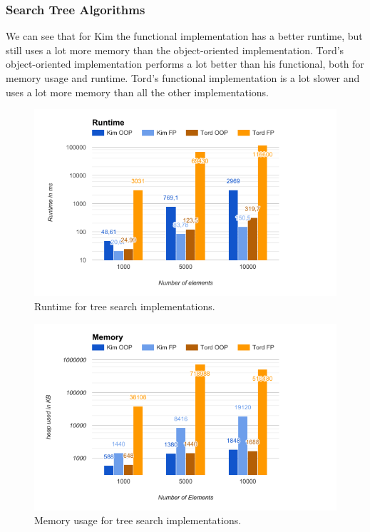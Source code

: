 \documentclass {article}
\begin{document}
\subsubsection{Search Tree Algorithms}
We can see that for Kim the functional implementation has a better runtime, but still uses a lot more memory than the object-oriented implementation. Tord's object-oriented implementation performs a lot better than his functional, both for memory usage and runtime. Tord's functional implementation is a lot slower and uses a lot more memory than all the other implementations.

\begin{figure}[H]
\includegraphics[width=\textwidth]{binary-tree-runtime}

\caption{Runtime for tree search implementations.}
\label{fig:binary-tree-runtime}
\end{figure}

\begin{figure}[H]
\includegraphics[width=\textwidth]{binary-tree-memory}

\caption{Memory usage for tree search implementations.}
\label{fig:binary-tree-memory}
\end{figure}
\end{document}
